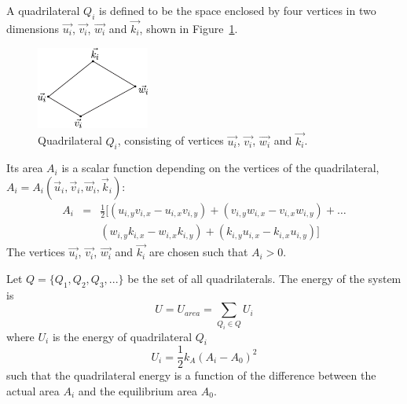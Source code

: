 A quadrilateral $Q_i$ is defined to be the space enclosed by four vertices in two dimensions  $\vec{u_i}$, $\vec{v_i}$, $\vec{w_i}$ and $\vec{k_i}$, shown in Figure~\ref{Tetrahedron}.
\begin{figure}[ht]
\begin{center}
\includegraphics[width=0.33\textwidth, clip=true]{./Chapters/03_GLM/./Images/Quadrilateral} 
\caption{Quadrilateral $Q_i$, consisting of vertices $\vec{u_i}$, $\vec{v_i}$, $\vec{w_i}$ and $\vec{k_i}$.}
\label{Tetrahedron}
\end{center}
\end{figure}
Its area $A_i$ is a scalar function depending on the vertices of the quadrilateral,~$A_i=A_i(\vec{u}_i, \vec{v}_i, \vec{w}_i, \vec{k}_i)$: 
\begin{eqnarray}
A_i&=&\frac{1}{2}
[\left( u_{i,y} v_{i,x} - u_{i,x} v_{i,y} \right) + \left( v_{i,y} w_{i,x} - v_{i,x} w_{i,y} \right) + \ldots \\
& & \left( w_{i,y} k_{i,x} - w_{i,x} k_{i,y} \right) + \left( k_{i,y} u_{i,x} - k_{i,x} u_{i,y} \right) ]
\label{areaQ}
\end{eqnarray}
The vertices $\vec{u_i}$, $\vec{v_i}$, $\vec{w_i}$ and $\vec{k_i}$ are chosen such that $A_i > 0$.

Let $Q = \{Q_1, Q_2, Q_3, ...\}$ be the set of all quadrilaterals. The energy of the system is
\begin{equation}
U=U_{area}=\sum\limits_{Q_i\in Q}U_i
\end{equation}
where $U_i$ is the energy of quadrilateral $Q_i$
\begin{equation}
U_i=\frac{1}{2}k_A \left(A_i-A_0\right)^2
\end{equation}
such that the quadrilateral energy is a function of the difference between the actual area $A_i$ and the equilibrium area $A_0$. 

